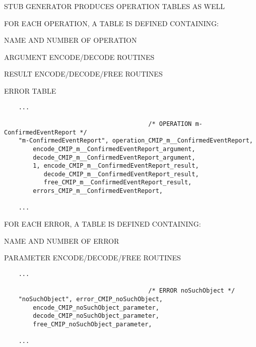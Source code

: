 \begin{bwslide}

\begin{nrtc}
\item	STUB GENERATOR PRODUCES OPERATION TABLES AS WELL

\item	FOR EACH OPERATION, A TABLE IS DEFINED CONTAINING:
    \begin{nrtc}
    \item	NAME AND NUMBER OF OPERATION

    \item	ARGUMENT ENCODE/DECODE ROUTINES

    \item	RESULT ENCODE/DECODE/FREE ROUTINES

    \item	ERROR TABLE
    \end{nrtc}
\end{nrtc}\small

\begin{verbatim}
    ...

                                        /* OPERATION m-ConfirmedEventReport */
    "m-ConfirmedEventReport", operation_CMIP_m__ConfirmedEventReport,
        encode_CMIP_m__ConfirmedEventReport_argument,
        decode_CMIP_m__ConfirmedEventReport_argument,
        1, encode_CMIP_m__ConfirmedEventReport_result,
           decode_CMIP_m__ConfirmedEventReport_result,
           free_CMIP_m__ConfirmedEventReport_result,
        errors_CMIP_m__ConfirmedEventReport,

    ...
\end{verbatim}
\end{bwslide}


\begin{bwslide}

\begin{nrtc}
\item	FOR EACH ERROR, A TABLE IS DEFINED CONTAINING:
    \begin{nrtc}
    \item	NAME AND NUMBER OF ERROR

    \item	PARAMETER ENCODE/DECODE/FREE ROUTINES
    \end{nrtc}
\end{nrtc}\small

\begin{verbatim}
    ...

                                        /* ERROR noSuchObject */
    "noSuchObject", error_CMIP_noSuchObject,
        encode_CMIP_noSuchObject_parameter,
        decode_CMIP_noSuchObject_parameter,
        free_CMIP_noSuchObject_parameter,

    ...
\end{verbatim}
\end{bwslide}


